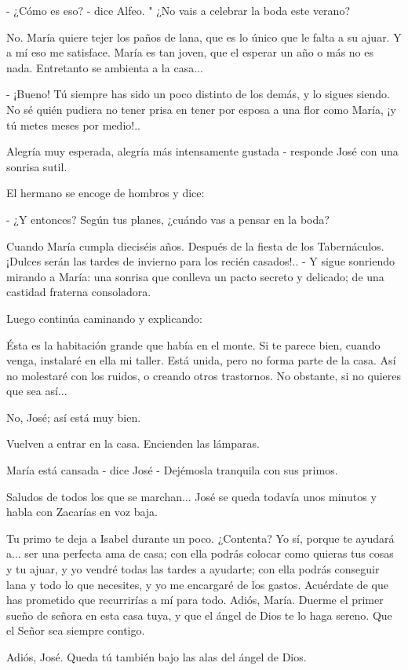 \documentclass[12pt, twoside, openright]{book} %
\begin{document}
- ¿Cómo es eso? - dice Alfeo. " ¿No vais a celebrar la boda este verano? 

No. María quiere tejer los paños de lana, que es lo único que le falta a su ajuar. Y a mí eso me satisface. María es tan joven, que el esperar un año o más no es nada. Entretanto se ambienta a la casa... 

- ¡Bueno! Tú siempre has sido un poco distinto de los demás, y lo sigues siendo. No sé quién pudiera no tener prisa en tener por esposa a una flor como María, ¡y tú metes meses por medio!.. 

Alegría muy esperada, alegría más intensamente gustada - responde José con una sonrisa sutil. 

El hermano se encoge de hombros y dice: 

- ¿Y entonces? Según tus planes, ¿cuándo vas a pensar en la boda? 

Cuando María cumpla dieciséis años. Después de la fiesta de los Tabernáculos. ¡Dulces serán las tardes de invierno para los recién casados!.. - Y sigue sonriendo mirando a María: una sonrisa que conlleva un pacto secreto y delicado; de una castidad fraterna consoladora. 

Luego continúa caminando y explicando: 

Ésta es la habitación grande que había en el monte. Si te parece bien, cuando venga, instalaré en ella mi taller. Está unida, pero no forma parte de la casa. Así no molestaré con los ruidos, o creando otros trastornos. No obstante, si no quieres que sea así... 

No, José; así está muy bien. 

Vuelven a entrar en la casa. Encienden las lámparas. 

María está cansada - dice José - Dejémosla tranquila con sus primos. 

Saludos de todos los que se marchan... José se queda todavía unos minutos y habla con Zacarías en voz baja. 

Tu primo te deja a Isabel durante un poco. ¿Contenta? Yo sí, porque te ayudará a... ser una perfecta ama de casa; con ella podrás colocar como quieras tus cosas y tu ajuar, y yo vendré todas las tardes a ayudarte; con ella podrás conseguir lana y todo lo que necesites, y yo me encargaré de los gastos. Acuérdate de que has prometido que recurrirías a mí para todo. Adiós, María. Duerme el primer sueño de señora en esta casa tuya, y que el ángel de Dios te lo haga sereno. Que el Señor sea siempre contigo. 

Adiós, José. Queda tú también bajo las alas del ángel de Dios. 
\end{document}
